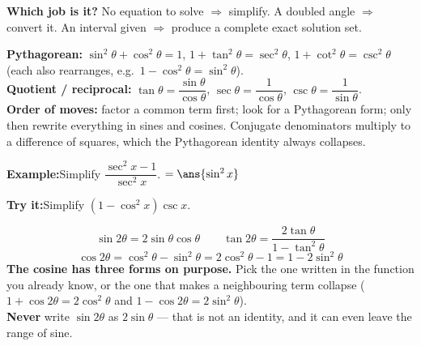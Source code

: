 \documentclass[12pt]{article}
\begin{document}

\noindent\small \textbf{Which job is it?} No equation to solve
$\Rightarrow$ simplify. A doubled angle $\Rightarrow$ convert it. An interval
given $\Rightarrow$ produce a complete exact solution set.\normalsize


\begin{formulabox}
\textbf{Pythagorean:} \; $\sin^2\theta + \cos^2\theta = 1$, \;
$1 + \tan^2\theta = \sec^2\theta$, \; $1 + \cot^2\theta = \csc^2\theta$
(each also rearranges, e.g.\ $1 - \cos^2\theta = \sin^2\theta$).\\[3pt]
\textbf{Quotient / reciprocal:} \; $\tan\theta = \dfrac{\sin\theta}{\cos\theta}$,
\; $\sec\theta = \dfrac{1}{\cos\theta}$, \; $\csc\theta = \dfrac{1}{\sin\theta}$.\\[3pt]
\textbf{Order of moves:} factor a common term first; look for a Pythagorean
form; only then rewrite everything in sines and cosines. Conjugate
denominators multiply to a difference of squares, which the Pythagorean
identity always collapses.
\end{formulabox}

\begin{examplebox}
\textbf{Example:}\quad Simplify $\dfrac{\sec^2 x - 1}{\sec^2 x}$.
$= \ans{\sin^2 x}$
\end{examplebox}

\begin{tryitbox}
\textbf{Try it:}\quad Simplify $(1 - \cos^2 x)\csc x$.\\[2pt]
\end{tryitbox}


\begin{formulabox}
\[ \sin 2\theta = 2\sin\theta\cos\theta \qquad
   \tan 2\theta = \frac{2\tan\theta}{1 - \tan^2\theta} \]
\[ \cos 2\theta = \cos^2\theta - \sin^2\theta
   = 2\cos^2\theta - 1 = 1 - 2\sin^2\theta \]
\textbf{The cosine has three forms on purpose.} Pick the one written in the
function you already know, or the one that makes a neighbouring term collapse
($1 + \cos 2\theta = 2\cos^2\theta$ and $1 - \cos 2\theta = 2\sin^2\theta$).\\[3pt]
\textbf{Never} write $\sin 2\theta$ as $2\sin\theta$ --- that is not an
identity, and it can even leave the range of sine.
\end{formulabox}
\end{document}
